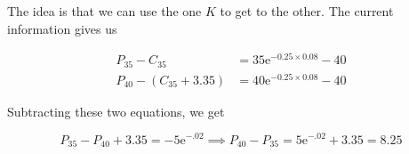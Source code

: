 \documentclass[12pt, letterpaper]{article}
\newcommand{\e}{\mathrm{e}}
\begin{document}
    The idea is that we can use the one \(K\) to get to the other. The current information gives us 

    \begin{align*}
    P_{35} - C_{35} &= 35 \e^{-0.25 \times 0.08} - 40 \\
    P_{40} - (C_{35} + 3.35) &= 40 \e^{-0.25 \times 0.08} - 40
    \end{align*}

    Subtracting these two equations, we get 

    \[ P_{35} - P_{40} + 3.35 = -5 \e^{-.02} \implies P_{40} - P_{35} = 5 \e^{-.02} + 3.35 = 8.25   \]


    


\end{document}
